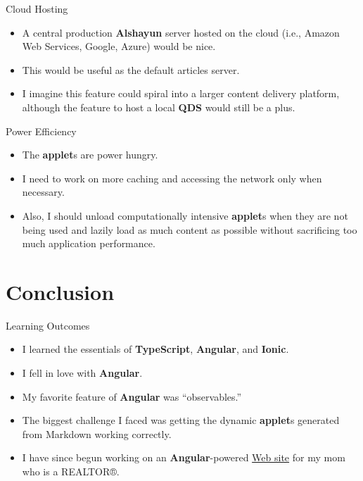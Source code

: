 \documentclass{beamer}
\begin{document}
\begin{frame}{Cloud Hosting}
    \begin{itemize}
        \item A central production \textbf{Alshayun} server hosted on the cloud
            (i.e., Amazon Web Services, Google, Azure) would be nice.
        \item This would be useful as the default articles server.
        \item I imagine this feature could spiral into a larger content delivery
            platform, although the feature to host a local \textbf{QDS} would
            still be a plus.
    \end{itemize}
\end{frame}

\begin{frame}{Power Efficiency}
    \begin{itemize}
        \item The \textbf{applet}s are power hungry.
        \item I need to work on more caching and accessing the network only when
            necessary.
        \item Also, I should unload computationally intensive \textbf{applet}s
            when they are not being used and lazily load as much content as
            possible without sacrificing too much application performance.
    \end{itemize}
\end{frame}

\section{Conclusion}

\begin{frame}{Learning Outcomes}
    \begin{itemize}
        \item I learned the essentials of \textbf{TypeScript}, \textbf{Angular},
            and \textbf{Ionic}.
        \item I fell in love with \textbf{Angular}.
        \item My favorite feature of \textbf{Angular} was ``observables.''
        \item The biggest challenge I faced was getting  the dynamic
            \textbf{applet}s generated from Markdown working correctly.
        \item I have since begun working on an \textbf{Angular}-powered
            \href{https://kristinickells.com}{Web site} for my mom who is a
            REALTOR®.
    \end{itemize}
\end{frame}
\end{document}
